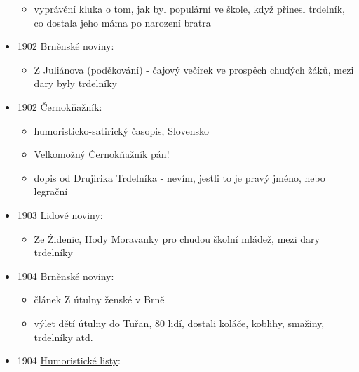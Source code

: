 \begin{itemize}
  \begin{itemize}
  \tightlist
  \item
    vyprávění kluka o tom, jak byl populární ve škole, když přinesl
    trdelník, co dostala jeho máma po narození bratra
  \end{itemize}
\item
  1902
  \href{https://ceskadigitalniknihovna.cz/view/uuid:b0836ae0-7a03-11e3-ae4b-001018b5eb5c?page=uuid\%3A5bf570c0-7bd1-11e3-ae4b-001018b5eb5c&fulltext=trdeln\%C3\%ADk\%20OR\%20trdeln\%C3\%ADky\%20OR\%20trdeln\%C3\%ADk\%C5\%AF&source=mzk}{Brněnské
  noviny}:

  \begin{itemize}
  \tightlist
  \item
    Z Juliánova (poděkování) - čajový večírek ve prospěch chudých žáků,
    mezi dary byly trdelníky
  \end{itemize}
\item
  1902
  \href{https://dikda.snk.sk/uuid/uuid:58996fdb-67e7-405a-a594-2f58269ee2bf}{Černokňažník}:

  \begin{itemize}
  \tightlist
  \item
    humoristicko-satirický časopis, Slovensko
  \item
    Velkomožný Černokňažník pán!
  \item
    dopis od Drujirika Trdelníka - nevím, jestli to je pravý jméno, nebo
    legrační
  \end{itemize}
\item
  1903
  \href{https://www.digitalniknihovna.cz/vkol/uuid/uuid:b799eafc-435d-11dd-b505-00145e5790ea}{Lidové
  noviny}:

  \begin{itemize}
  \tightlist
  \item
    Ze Židenic, Hody Moravanky pro chudou školní mládež, mezi dary
    trdelníky
  \end{itemize}
\item
  1904
  \href{https://ceskadigitalniknihovna.cz/view/uuid:62df2c30-8367-11e3-a606-005056827e51?page=uuid\%3A3bd12fb0-86e3-11e3-b6b2-005056822549&fulltext=trdeln\%C3\%ADk\%20OR\%20trdeln\%C3\%ADky\%20OR\%20trdeln\%C3\%ADk\%C5\%AF&source=mzk}{Brněnské
  noviny}:

  \begin{itemize}
  \tightlist
  \item
    článek Z útulny ženské v Brně
  \item
    výlet dětí útulny do Tuřan, 80 lidí, dostali koláče, koblihy,
    smažiny, trdelníky atd.
  \end{itemize}
\item
  1904
  \href{https://ceskadigitalniknihovna.cz/uuid/uuid:e6cbfaf4-435d-11dd-b505-00145e5790ea}{Humoristické
  listy}:


\end{itemize}
